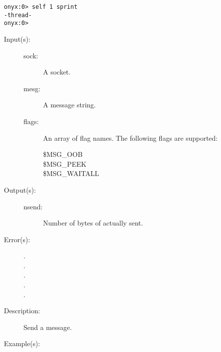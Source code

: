 \begin{description}
\begin{description}
\begin{verbatim}
onyx:0> self 1 sprint
-thread-
onyx:0>
		\end{verbatim}
	\end{description}
\label{systemdict:send}
\item[{\onyxop{sock mesg flags}{send}{nsend}}: ]
\item[{\onyxop{sock mesg}{send}{nsend}}: ]
	\begin{description}\item[]
	\item[Input(s): ]
		\begin{description}\item[]
		\item[sock: ]
			A socket.
		\item[mesg: ]
			A message string.
		\item[flags: ]
			An array of flag names.  The following flags are
			supported:
			\begin{description}%
			\item[\$MSG\_OOB]
			\item[\$MSG\_PEEK]
			\item[\$MSG\_WAITALL]
			\end{description}
		\end{description}
	\item[Output(s): ]
		\begin{description}\item[]
		\item[nsend: ]
			Number of bytes of  actually sent.
		\end{description}
	\item[Error(s): ]
		\begin{description}\item[]
		\item[.]
		\item[.]
		\item[.]
		\item[.]
		\item[.]
		\end{description}
	\item[Description: ]
		Send a message.
	\item[Example(s): ]\begin{verbatim}


\end{verbatim}
\end{description}
\end{description}
